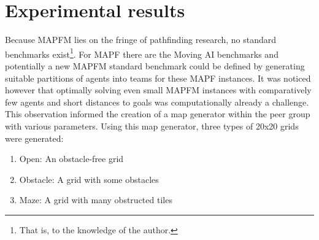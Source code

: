 \documentclass[english]{article}
\begin{document}
	\section{Experimental results}
	Because MAPFM lies on the fringe of pathfinding research, no standard benchmarks exist\footnote{That is, to the knowledge of the author.}. For MAPF there are the Moving AI benchmarks \cite{sturtevant2012} and potentially a new MAPFM standard benchmark could be defined by generating suitable partitions of agents into teams for these MAPF instances. It was noticed however that optimally solving even small MAPFM instances with comparatively few agents and short distances to goals was computationally already a challenge. This observation informed the creation of a map generator within the peer group with various parameters. Using this map generator, three types of 20x20 grids were generated:
	\begin{enumerate}
		\item Open: An obstacle-free grid
		\item Obstacle: A grid with some obstacles
		\item Maze: A grid with many obstructed tiles
	\end{enumerate}
	
\end{document}
